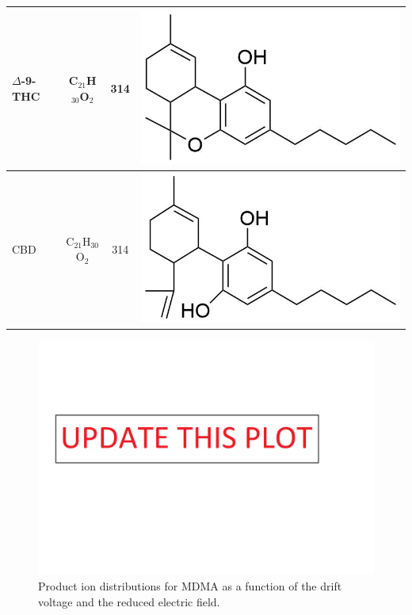 \begin{table}
\begin{tabular}{lccc}
$\Delta$-9-THC & C$_{21}$H$_{30}$O$_2$ & 314 &  
\begin{minipage}[c]{0.3\linewidth}\centering
\includegraphics[height=0.1\textheight]{pics/other_drugs/THC_struct.png}\end{minipage}\\ \midrule
CBD & C$_{21}$H$_{30}$O$_2$ & 314 &  
\begin{minipage}[c]{0.3\linewidth}\centering
\includegraphics[height=0.1\textheight]{pics/other_drugs/CBD_struct.png}\end{minipage}\\ 
\bottomrule
\end{tabular}
\label{tab:DRs_structs}
\end{table}



\begin{figure}[htb]
\centering
\includegraphics[width=0.50\linewidth]{pics/other_drugs/MDMA-br.png}
\caption{Product ion distributions for MDMA as a function of the drift voltage and the reduced electric field.}
\label{fig:DR_mdma}
\end{figure}



